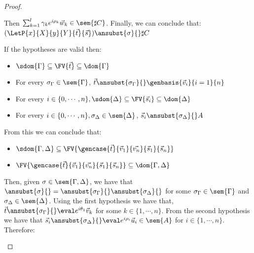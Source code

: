 \begin{proof}
\begin{description}
    Then $\sum_{k=1}^{l}\gamma_k e^{i\rho_k} \vec{w}_{k}\in\sem{\sharp C}$. Finally, we can conclude that: $(\LetP{x}{X}{y}{Y}{\vec{t}}{\vec{s}})\ansubst{\sigma}{}\real{\sharp C}$

    \item[Case] If the hypotheses are valid then:
    \begin{itemize}
        \item $\sdom{\Gamma}\subseteq \FV{\vec{t}}\subseteq \dom{\Gamma}$
        \item For every $\sigma_\Gamma\in\sem{\Gamma}$, $\vec{t}\ansubst{\sigma_\Gamma}{}\real\genbasis{\vec{v}_{i}}{i=1}{n}$
        \item For every $i\in\{0,\dotsb ,n\}, \sdom{\Delta}\subseteq \FV{\vec{s}_{i}}\subseteq \dom{\Delta}$
        \item For every $i\in\{0,\dotsb ,n\}, \sigma_\Delta\in\sem{\Delta}$, $\vec{s}_{i}\ansubst{\sigma_\Delta}{}\real A$
    \end{itemize}

    From this we can conclude that:

    \begin{itemize}
        \item $\sdom{\Gamma,\Delta}\subseteq \FV{\gencase{\vec{t}}{\vec{v}_{1}}{\vec {v_n}}{\vec{s}_{1}}{\vec{s}_{n}}}$
        \item $\FV{\gencase{\vec{t}}{\vec{v}_{1}}{\vec {v_n}}{\vec{s}_{1}}{\vec{s}_{n}}}\subseteq \dom{\Gamma,\Delta}$
    \end{itemize}
    
    Then, given $\sigma\in\sem{\Gamma,\Delta}$, we have that $\ansubst{\sigma}{}=\ansubst{\sigma_\Gamma}{}\ansubst{\sigma_\Delta}{}$ for some $\sigma_\Gamma\in\sem{\Gamma}$ and $\sigma_\Delta\in\sem{\Delta}$. Using the first hypothesis we have that, $\vec{t}\ansubst{\sigma_\Gamma}{}\eval e^{i\theta_1}\vec{v}_{k}$ for some $k\in\{1,\dotsb ,n\}$. From the second hypothesis we have that $\vec{s}_{i}\ansubst{\sigma_\Delta}{}\eval e^{i\rho_i}\vec{u}_{i}\in\sem{A}$ for $i\in\{1,\dotsb , n\}$. Therefore:


\end{description}
\end{proof}
